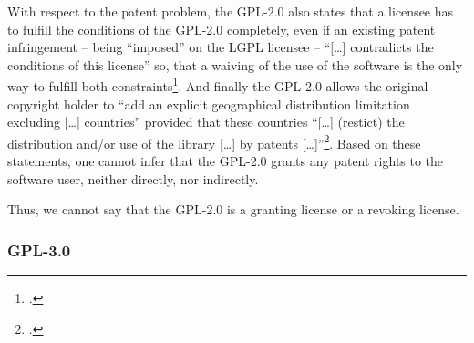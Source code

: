 With respect to the patent problem, the GPL-2.0 also states that a licensee has
to fulfill the conditions of the GPL-2.0 completely, even if an existing patent
infringement -- being \enquote{imposed} on the LGPL licensee --
\enquote{[\ldots] contradicts the conditions of this license} so, that a waiving
of the use of the software is the only way to fulfill both
constraints\footcite[cf.][\nopage wp.\ §11]{Gpl20OsiLicense1991a}. And finally
the GPL-2.0 allows the original copyright holder to \enquote{add an explicit
geographical distribution limitation excluding [\ldots] countries} provided that
these countries \enquote{[\ldots] (restict) the distribution and/or use of the
library [\ldots] by patents [\ldots]}\footcite[cf.][\nopage wp.\
§12]{Gpl20OsiLicense1991a}. Based on these statements, one cannot infer that the
GPL-2.0 grants any patent rights to the software user, neither directly, nor
indirectly.

Thus, we cannot say that the GPL-2.0 is a granting license or a revoking
license.

\subsubsection {GPL-3.0}\label{subsec:Gpl30PatentClause}

